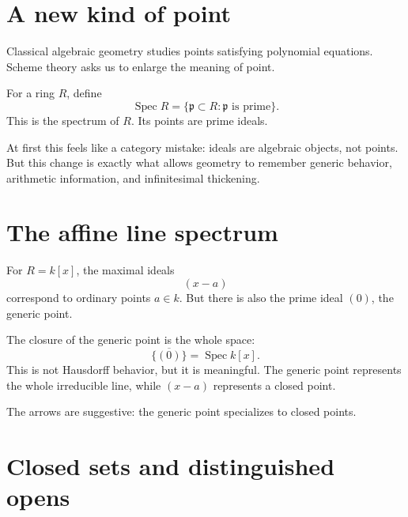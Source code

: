 
\section{A new kind of point}

Classical algebraic geometry studies points satisfying polynomial equations. Scheme theory asks us to enlarge the meaning of point.

For a ring \(R\), define
\[
  \operatorname{Spec}R=\{\mathfrak p\subset R:\mathfrak p\text{ is prime}\}.
\]
This is the spectrum of \(R\). Its points are prime ideals.

At first this feels like a category mistake: ideals are algebraic objects, not points. But this change is exactly what allows geometry to remember generic behavior, arithmetic information, and infinitesimal thickening.

\section{The affine line spectrum}

For \(R=k[x]\), the maximal ideals
\[
  (x-a)
\]
correspond to ordinary points \(a\in k\). But there is also the prime ideal \((0)\), the generic point.

The closure of the generic point is the whole space:
\[
  \overline{\{(0)\}}=\operatorname{Spec}k[x].
\]
This is not Hausdorff behavior, but it is meaningful. The generic point represents the whole irreducible line, while \((x-a)\) represents a closed point.

\begin{center}
\end{center}

The arrows are suggestive: the generic point specializes to closed points.

\section{Closed sets and distinguished opens}

